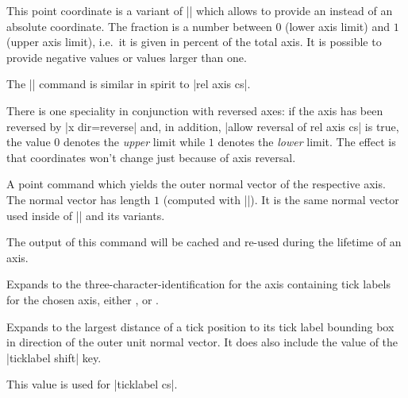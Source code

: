 \begin{command}{\pgfplotsqpointoutsideofaxisrel{}}
	This point coordinate is a variant of |\pgfplotsqpointoutsideofaxis| which allows to provide an  instead of an absolute coordinate. The fraction is a number between $0$ (lower axis limit) and $1$ (upper axis limit), i.e.\ it is given in percent of the total axis. It is possible to provide negative values or values larger than one.

	The |\pgfplotsqpointoutsideofaxisrel| command is similar in spirit to |rel axis cs|.

	There is one speciality in conjunction with reversed axes: if the axis has been reversed by |x dir=reverse| and, in addition, |allow reversal of rel axis cs| is true, the value $0$ denotes the \emph{upper} limit while $1$ denotes the \emph{lower} limit. The effect is that coordinates won't change just because of axis reversal.
%
\end{command}

\begin{command}{\pgfplotspointouternormalvectorofaxis{}}
	A point command which yields the outer normal vector of the respective axis. The normal vector has length $1$ (computed with |\pgfpointnormalised|). It is the same normal vector used inside of |\pgfplotsqpointoutsideofaxis| and its variants.

	The output of this command will be cached and re-used during the lifetime of an axis. 
\end{command}

\begin{command}{\pgfplotsticklabelaxisspec{}}
	Expands to the three-character-identification for the axis containing tick labels for the chosen axis, either ,  or .
\end{command}

\begin{command}{\pgfplotsvalueoflargesttickdimen{}}
	Expands to the largest distance of a tick position to its tick label bounding box in direction of the outer unit normal vector. It does also include the value of the |ticklabel shift| key.

	This value is used for |ticklabel cs|.
\end{command}

